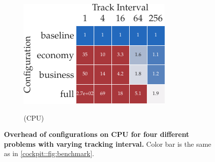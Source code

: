 \begin{figure}[t]
\begin{subfigure}[t]{0.35\linewidth}
    \label{cockpit::fig:app_benchmark_configurations_cpu-cifar}
  \end{subfigure}
  \hspace{0.1\linewidth}
  \begin{subfigure}[t]{0.35\linewidth}
    \centering
    \caption{\fmnist \twoctwod (CPU)}
    \includegraphics{../repos/cockpit-paper/fig/01_benchmark/output/fig_grid/benchmark_fmnist_2c2d_cpu_app_thesis-wide}
    \label{cockpit::fig:app_benchmark_configurations_cpu-fmnist}
  \end{subfigure}
  \caption{\textbf{Overhead of \cockpittitle configurations on CPU for four
      different problems with varying tracking interval.} Color bar is the same
    as in \autoref{cockpit::fig:benchmark}.}
  \label{cockpit::fig:app_benchmark_configurations_cpu}
\end{figure}

\captionsetup[subfigure]{justification=centering, singlelinecheck=true}


